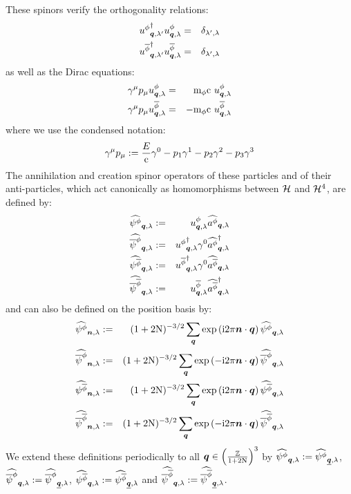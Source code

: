 \documentclass[10pt,a4paper,twoside,openany]{book}
\begin{document}
These spinors verify the orthogonality relations:
\begin{eqnarray*}
\ddirspin \pt \q {\sp'} \dirspin \pt \q \sp & = & \delta_{\sp',\sp} \\
\ddirspin {\antiparticle \pt} \q {\sp'} \dirspin {\antiparticle \pt} \q \sp & = & \delta_{\sp',\sp}
\end{eqnarray*}
as well as the Dirac equations:
\begin{eqnarray*}
\gammat \mu \stvl p \mu \dirspin \pt \q \sp & = & \mp \pt \c\ \dirspin \pt \q \sp \\
\gammat \mu \stvl p \mu \dirspin {\antiparticle \pt} \q \sp & = & - \mp \pt \c\ \dirspin {\antiparticle \pt} \q \sp
\end{eqnarray*}
where we use the condensed notation:
\begin{equation*}
\gammat \mu \stvl p \mu \eqdef \frac E \c \gammat 0 - p_1 \gammat 1 - p_2 \gammat 2 - p_3 \gammat 3
\end{equation*}
The annihilation and creation spinor operators of these particles and of their anti-particles, which act canonically as homomorphisms between $\H$ and $\H^4$, are defined by:
\begin{eqnarray*}
\SAop \pt \q \sp & \eqdef & \dirspin \pt \q \sp \aop \pt \q \sp \\
\SCop \pt \q \sp & \eqdef & \ddirspin \pt \q \sp \gammat 0 \cop \pt \q \sp \\
\SAop {\antiparticle \pt} \q \sp & \eqdef & \ddirspin {\antiparticle \pt} \q \sp \gammat 0 \aop {\antiparticle \pt} \q \sp \\
\SCop {\antiparticle \pt} \q \sp & \eqdef & \dirspin {\antiparticle \pt} \q \sp \cop {\antiparticle \pt} \q \sp
\end{eqnarray*}
and can also be defined on the position basis by:
\begin{eqnarray*}
\SAop \pt \n \sp & \eqdef & ( 1+2\N )^{-3/2} \sum_{\q} \exp{\i 2 \pi \n \ssp \q} \SAop \pt \q \sp \\
\SCop \pt \n \sp & \eqdef & ( 1+2\N )^{-3/2} \sum_{\q} \exp{-\i 2 \pi \n \ssp \q} \SCop \pt \q \sp \\
\SAop {\antiparticle \pt} \n \sp & \eqdef & ( 1+2\N )^{-3/2} \sum_{\q} \exp{\i 2 \pi \n \ssp \q} \SAop {\antiparticle \pt} \q \sp \\
\SCop {\antiparticle \pt} \n \sp & \eqdef & ( 1+2\N )^{-3/2} \sum_{\q} \exp{-\i 2 \pi \n \ssp \q} \SCop {\antiparticle \pt} \q \sp
\end{eqnarray*}
We extend these definitions periodically to all $\q \in \ILD$ by $\SAop \pt \q \sp \eqdef \SAop \pt {\eqp \q} \sp$, $\SCop \pt \q \sp \eqdef \SCop \pt {\eqp \q} \sp$, $\SAop {\antiparticle \pt} \q \sp \eqdef \SAop {\antiparticle \pt} {\eqp \q} \sp$ and $\SCop {\antiparticle \pt} \q \sp \eqdef \SCop {\antiparticle \pt} {\eqp \q} \sp$.
\end{document}

